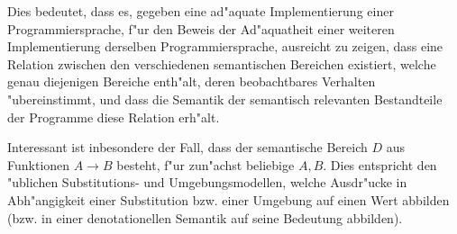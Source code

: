 \documentclass[12pt,a4paper]{article}
\begin{document}
Dies bedeutet, dass es, gegeben eine ad"aquate Implementierung einer Programmiersprache, f"ur den
Beweis der Ad"aquatheit einer weiteren Implementierung derselben Programmiersprache, ausreicht zu
zeigen, dass eine Relation zwischen den verschiedenen semantischen Bereichen existiert, welche
genau diejenigen Bereiche enth"alt, deren beobachtbares Verhalten "ubereinstimmt, und dass die
Semantik der semantisch relevanten Bestandteile der Programme diese Relation erh"alt.



Interessant ist inbesondere der Fall, dass der semantische Bereich $D$ aus Funktionen $A \to B$ besteht,
f"ur zun"achst beliebige $A,B$. Dies entspricht den "ublichen Substitutions- und Umgebungsmodellen, welche
Ausdr"ucke in Abh"angigkeit einer Substitution bzw. einer Umgebung auf einen Wert abbilden (bzw. in einer
denotationellen Semantik auf seine Bedeutung abbilden).
\end{document}
